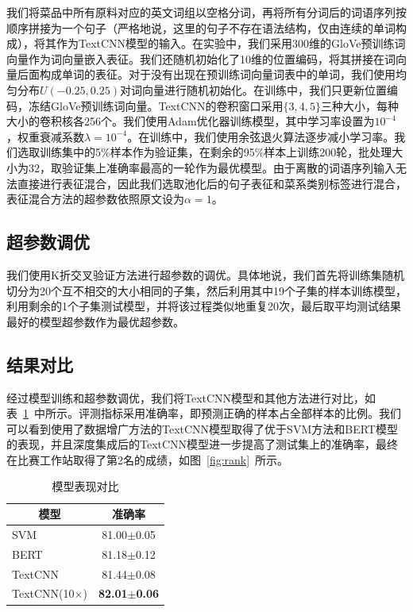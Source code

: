 我们将菜品中所有原料对应的英文词组以空格分词，再将所有分词后的词语序列按顺序拼接为一个句子（严格地说，这里的句子不存在语法结构，仅由连续的单词构成），将其作为TextCNN模型的输入。在实验中，我们采用300维的GloVe预训练词向量\cite{pennington2014glove}作为词向量嵌入表征。我们还随机初始化了10维的位置编码，将其拼接在词向量后面构成单词的表征。对于没有出现在预训练词向量词表中的单词，我们使用均匀分布$U(-0.25,0.25)$对词向量进行随机初始化。在训练中，我们只更新位置编码，冻结GloVe预训练词向量。TextCNN的卷积窗口采用$\{3,4,5\}$三种大小，每种大小的卷积核各256个。我们使用Adam优化器\cite{kingma2014adam}训练模型，其中学习率设置为$10^{-4}$，权重衰减系数$\lambda=10^{-4}$。在训练中，我们使用余弦退火算法\cite{loshchilov2017sgdr}逐步减小学习率。我们选取训练集中的5\%样本作为验证集，在剩余的95\%样本上训练200轮，批处理大小为32，取验证集上准确率最高的一轮作为最优模型。由于离散的词语序列输入无法直接进行表征混合，因此我们选取池化后的句子表征和菜系类别标签进行混合，表征混合方法的超参数依照原文\cite{zhang2018mixup}设为$\alpha=1$。

\subsection{超参数调优}

我们使用K折交叉验证方法进行超参数的调优。具体地说，我们首先将训练集随机切分为20个互不相交的大小相同的子集，然后利用其中19个子集的样本训练模型，利用剩余的1个子集测试模型，并将该过程类似地重复20次，最后取平均测试结果最好的模型超参数作为最优超参数。

\subsection{结果对比}

经过模型训练和超参数调优，我们将TextCNN模型和其他方法进行对比，如表~\ref{tab:results}~中所示。评测指标采用准确率，即预测正确的样本占全部样本的比例。我们可以看到使用了数据增广方法的TextCNN模型取得了优于SVM方法和BERT模型的表现，并且深度集成后的TextCNN模型进一步提高了测试集上的准确率，最终在比赛工作站取得了第2名的成绩，如图~\ref{fig:rank}~所示。

\begin{table}[htbp]
    \centering
    \begin{tabular}{lc}
        \toprule
        \multicolumn{1}{c}{模型} & 准确率 \\
        \midrule
        SVM & 81.00$\pm$0.05 \\
        BERT & 81.18$\pm$0.12 \\
        TextCNN & 81.44$\pm$0.08 \\
        TextCNN(10$\times$) & {\bf 82.01}$\pm${\bf 0.06} \\
        \bottomrule
    \end{tabular}
    \caption{模型表现对比}
    \label{tab:results}
\end{table}

